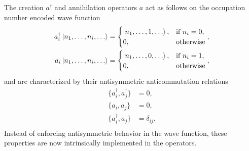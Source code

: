 \documentclass[../main.tex]{subfiles}
\begin{document}
The creation $a^\dagger$ and annihilation operators $a$ act as follows on the occupation number encoded wave function
\begin{align}
    a^\dagger_i \ket{n_1, \dots, n_i, \dots} = \begin{cases}
        \ket{n_1, \dots, 1, \dots}, & \text{if } n_i = 0, \\        0, & \text{otherwise}
    \end{cases}, \\
    a_i \ket{n_1, \dots, n_i, \dots} = \begin{cases}
    \ket{n_1, \dots, 0, \dots}, & \text{if } n_i = 1, \\        0, & \text{otherwise}
    \end{cases},
\end{align} and are characterized by their antisymmetric anticommutation relations
\begin{align}
    \{ a_i^\dagger, a_j^\dagger \} &= 0, \\
    \{ a_i, a_j \} &= 0, \\
    \{ a_i^\dagger, a_j \} &= \delta_{ij}. \\
\end{align} Instead of enforcing antisymmetric behavior in the wave function, these properties are now intrinsically implemented in the operators.
\end{document}
